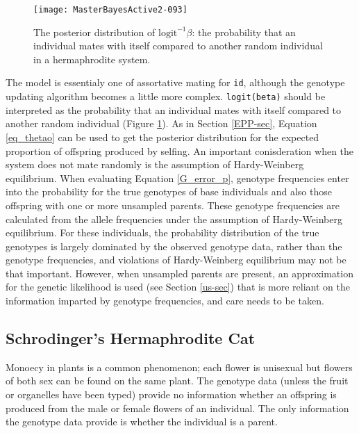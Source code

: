 \documentclass{article}
\begin{document}
\begin{figure}[!h]
\begin{center}
\texttt{[image: MasterBayesActive2-093]}
\end{center}
\caption{The posterior distribution of $\textrm{logit}^{-1}\beta$: the probability that an individual mates with itself compared to another random individual in a hermaphrodite system.}
\label{Herm-fig}
\end{figure}

The model is essentialy one of assortative mating for \texttt{id}, although the genotype updating algorithm becomes a little more complex.  \texttt{logit(beta)} should be interpreted as the probability that an individual mates with itself compared to another random individual (Figure \ref{Herm-fig}).  As in Section \ref{EPP-sec}, Equation \ref{eq_thetao} can be used to get the posterior distribution for the expected proportion of offspring produced by selfing.  An important conisderation when the system does not mate randomly is the assumption of Hardy-Weinberg equilibrium.  When evaluating Equation \ref{G_error_p}, genotype frequencies enter into the probability for the true genotypes of base individuals and also those offspring with one or more unsampled parents. These genotype frequencies are calculated from the allele frequencies under the assumption of Hardy-Weinberg equilibrium. For these individuals, the probability distribution of the true genotypes is largely dominated by the observed genotype data, rather than the genotype frequencies, and violations of Hardy-Weinberg equilibrium may not be that important.  However, when unsampled parents are present, an approximation for the genetic likelihood is used (see Section \ref{us-sec}) that is more reliant on the information imparted by genotype frequencies, and care needs to be taken. 

\subsection{Schrodinger's Hermaphrodite Cat}
\label{SHC}

Monoecy in plants is a common phenomenon; each flower is unisexual but flowers of both sex can be found on the same plant.  The genotype data (unless the fruit or organelles have been typed) provide no information whether an offspring is produced from the male or female flowers of an individual. The only information the genotype data provide is whether the individual is a parent.\\
\end{document}
